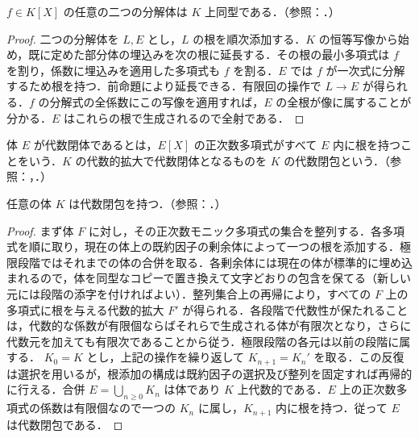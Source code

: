 \begin{prop}[分解体の一意性]
$f\in K[X]$ の任意の二つの分解体は $K$ 上同型である．（参照：．）
\end{prop}
\begin{proof}
二つの分解体を $L,E$ とし，$L$ の根を順次添加する．$K$ の恒等写像から始め，既に定めた部分体の埋込みを次の根に延長する．その根の最小多項式は $f$ を割り，係数に埋込みを適用した多項式も $f$ を割る．$E$ では $f$ が一次式に分解するため根を持つ．前命題により延長できる．有限回の操作で $L\to E$ が得られる．$f$ の分解式の全係数にこの写像を適用すれば，$E$ の全根が像に属することが分かる．$E$ はこれらの根で生成されるので全射である．
\end{proof}
\begin{defn}[代数閉体と代数閉包]
体 $E$ が代数閉体であるとは，$E[X]$ の正次数多項式がすべて $E$ 内に根を持つことをいう．$K$ の代数的拡大で代数閉体となるものを $K$ の代数閉包という．（参照：，．）
\end{defn}
\begin{prop}[代数閉包の存在]
任意の体 $K$ は代数閉包を持つ．（参照：．）
\end{prop}
\begin{proof}
まず体 $F$ に対し，その正次数モニック多項式の集合を整列する．各多項式を順に取り，現在の体上の既約因子の剰余体によって一つの根を添加する．極限段階ではそれまでの体の合併を取る．各剰余体には現在の体が標準的に埋め込まれるので，体を同型なコピーで置き換えて文字どおりの包含を保てる（新しい元には段階の添字を付ければよい）．整列集合上の再帰により，すべての $F$ 上の多項式に根を与える代数的拡大 $F'$ が得られる．各段階で代数性が保たれることは，代数的な係数が有限個ならばそれらで生成される体が有限次となり，さらに代数元を加えても有限次であることから従う．極限段階の各元は以前の段階に属する．
$K_0=K$ とし，上記の操作を繰り返して $K_{n+1}=K_n'$ を取る．この反復は選択を用いるが，根添加の構成は既約因子の選択及び整列を固定すれば再帰的に行える．合併 $E=\bigcup_{n\geq0}K_n$ は体であり $K$ 上代数的である．$E$ 上の正次数多項式の係数は有限個なので一つの $K_n$ に属し，$K_{n+1}$ 内に根を持つ．従って $E$ は代数閉包である．
\end{proof}
